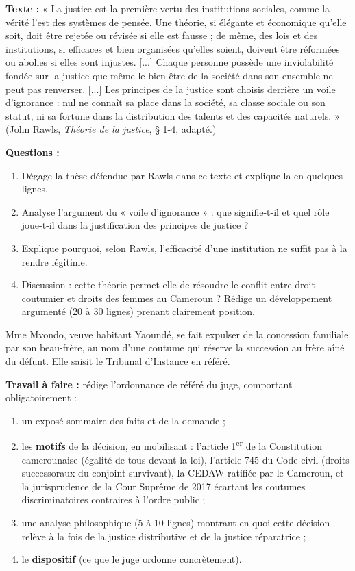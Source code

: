 \documentclass[11pt]{article}
\begin{document}
\begin{exercice}
\textbf{Texte :} « La justice est la première vertu des institutions sociales, comme la vérité l'est des systèmes de pensée. Une théorie, si élégante et économique qu'elle soit, doit être rejetée ou révisée si elle est fausse ; de même, des lois et des institutions, si efficaces et bien organisées qu'elles soient, doivent être réformées ou abolies si elles sont injustes. [...] Chaque personne possède une inviolabilité fondée sur la justice que même le bien-être de la société dans son ensemble ne peut pas renverser. [...] Les principes de la justice sont choisis derrière un voile d'ignorance : nul ne connaît sa place dans la société, sa classe sociale ou son statut, ni sa fortune dans la distribution des talents et des capacités naturels. » (John Rawls, \emph{Théorie de la justice}, § 1-4, adapté.)

\medskip
\textbf{Questions :}
\begin{enumerate}
\item Dégage la thèse défendue par Rawls dans ce texte et explique-la en quelques lignes.
\item Analyse l'argument du « voile d'ignorance » : que signifie-t-il et quel rôle joue-t-il dans la justification des principes de justice ?
\item Explique pourquoi, selon Rawls, l'efficacité d'une institution ne suffit pas à la rendre légitime.
\item Discussion : cette théorie permet-elle de résoudre le conflit entre droit coutumier et droits des femmes au Cameroun ? Rédige un développement argumenté (20 à 30 lignes) prenant clairement position.
\end{enumerate}
\end{exercice}

\begin{exercice}
Mme Mvondo, veuve habitant Yaoundé, se fait expulser de la concession familiale par son beau-frère, au nom d'une coutume qui réserve la succession au frère aîné du défunt. Elle saisit le Tribunal d'Instance en référé.

\medskip
\textbf{Travail à faire :} rédige l'ordonnance de référé du juge, comportant obligatoirement :
\begin{enumerate}
\item un exposé sommaire des faits et de la demande ;
\item les \textbf{motifs} de la décision, en mobilisant : l'article 1\textsuperscript{er} de la Constitution camerounaise (égalité de tous devant la loi), l'article 745 du Code civil (droits successoraux du conjoint survivant), la CEDAW ratifiée par le Cameroun, et la jurisprudence de la Cour Suprême de 2017 écartant les coutumes discriminatoires contraires à l'ordre public ;
\item une analyse philosophique (5 à 10 lignes) montrant en quoi cette décision relève à la fois de la justice distributive et de la justice réparatrice ;
\item le \textbf{dispositif} (ce que le juge ordonne concrètement).
\end{enumerate}
\end{exercice}
\end{document}
